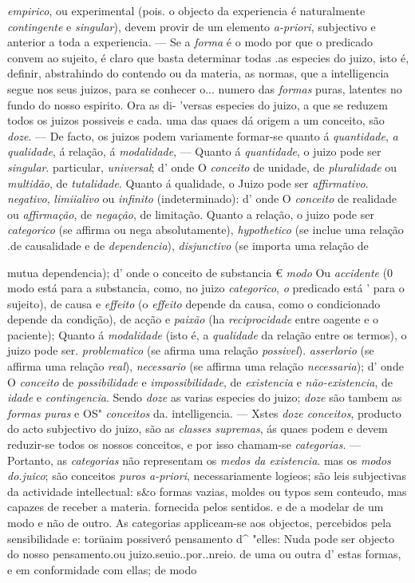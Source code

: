 \emph{empirico}, ou experimental (pois. o objecto da experiencia é naturalmente \emph{contingente} e \emph{singular}), devem provir de um elemento \emph{a-priori}, subjectivo e anterior a toda a experiencia. --- Se a \emph{forma} é o modo por que o predicado convem ao sujeito, é claro que basta determinar todas .as especies do juizo, isto é, definir, abstrahindo do contendo ou da materia, as normas, que a intelligencia segue nos seus juizos, para se conhecer o... numero das \emph{formas} puras, latentes no fundo do nosso espirito. Ora as di- 'versas especies do juizo, a que se reduzem todos os juizos possiveis e cada. uma das quaes dá origem a um conceito, são \emph{doze}. --- De facto, os juizos podem variamente formar-se quanto á \emph{quantidade}, \emph{a qualidade}, á relação, á \emph{modalidade}, --- Quanto á \emph{quantidade}, o juizo pode ser \emph{singular}. particular, \emph{universal}; d' onde O \emph{conceito} de unidade, de \emph{pluralidade} ou \emph{multidão}, de \emph{tutalidade}. Quanto á qualidade, o Juizo pode ser \emph{affirmativo}. \emph{negativo}, \emph{limiialivo} ou \emph{infinito} (indeterminado): d' onde O \emph{conceito} de realidade ou \emph{affirmação}, de \emph{negação}, de limitação. Quanto a relação, o juizo pode ser \emph{categorico} (se affirma ou nega absolutamente), \emph{hypothetico} (se inclue uma relação .de causalidade e de \emph{dependencia}), \emph{disjunctivo} (se importa uma relação de\par mutua dependencia); d' onde o conceito de substancia € \emph{modo} Ou \emph{accidente} (0 modo está para a substancia, como, no juizo \emph{categorico}, \emph{o} predicado está ' para o sujeito), de causa e \emph{effeito} (o \emph{effeito} depende da causa, como o condicionado depende da condição), de acção e \emph{paixão} (ha \emph{reciprocidade} entre oagente e o paciente); Quanto á \emph{modalidade} (isto é, a \emph{qualidade} da relação entre os termos), o juizo pode ser. \emph{problematico} (se afirma uma relação \emph{possivel}). \emph{asserlorio} (se affirma uma relação \emph{real}), \emph{necessario} (se affirma uma relação \emph{necessaria}); d' onde O \emph{conceito} de \emph{possibilidade} e \emph{impossibilidade}, de \emph{existencia} e \emph{não-existencia}, de \emph{idade} e \emph{contingencia}. Sendo \emph{doze} as varias especies do juizo; \emph{doze} são tambem as \emph{formas puras} e OS" \emph{conceitos} da. intelligencia. --- Xstes \emph{doze conceitos}, producto do acto subjectivo do juizo, são as \emph{classes supremas}, ás quaes podem e devem reduzir-se todos os nossos conceitos, e por isso chamam-se \emph{categorias}. --- Portanto, as \emph{categorias} não representam os \emph{medos da existencia}. mas os \emph{modos do.juico}; são conceitos \emph{puros a-priori}, necessariamente logieos; são leis subjectivas da actividade intellectual: s\&o formas vazias, moldes ou typos sem conteudo, mas capazes de receber a materia. fornecida pelos sentidos. e de a modelar de um modo e não de outro. As categorias appliceam-se aos objectos, percebidos pela sensibilidade e: torüaim possiveró pensamento d\textasciicircum{} "elles: Nuda pode ser objecto do nosso pensamento.ou juizo.seuio..por..nreio. de uma ou outra d' estas formas, e em conformidade com ellas; de modo 